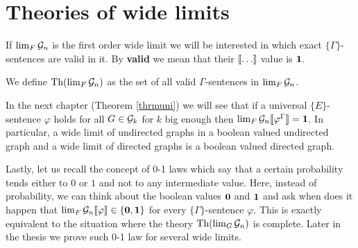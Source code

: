 \section{Theories of wide limits}

If $\lim_F\mathcal{G}_n$ is the first order wide limit we will be interested in which exact $\{\Gamma\}$-sentences are valid in it. By \textbf{valid} we mean that their $\llbracket\dots\rrbracket$ value is $\textbf{1}$.

\begin{defi}
We define $\text{Th}(\lim_F\mathcal{G}_n)$ as the set of all valid $\Gamma$-sentences in $\lim_{F}\mathcal{G}_n$.
\end{defi}

In the next chapter (Theorem \ref{thrmuni}) we will see that if a universal $\{E\}$-sentence $\varphi$ holds for all $G\in\mathcal{G}_k$ for $k$ big enough then $\lim_F\mathcal{G}_n\llbracket\varphi^\Gamma\rrbracket=\textbf{1}$. In particular, a wide limit of undirected graphs in a boolean valued undirected graph and a wide limit of directed graphs is a boolean valued directed graph.

Lastly, let us recall the concept of 0-1 laws which say that a certain probability tends either to $0$ or $1$ and not to any intermediate value. Here, instead of probability, we can think about the boolean values $\textbf{0}$ and $\textbf{1}$ and ask when does it happen that $\lim_F\mathcal{G}_n\llbracket\varphi\rrbracket\in\{\textbf{0},\textbf{1}\}$ for every $\{\Gamma\}$-sentence $\varphi$. This is exactly equivalent to the situation where the theory $\text{Th}(\lim_G \mathcal{G}_n)$ is complete. Later in the thesis we prove such 0-1 law for several wide limits.
